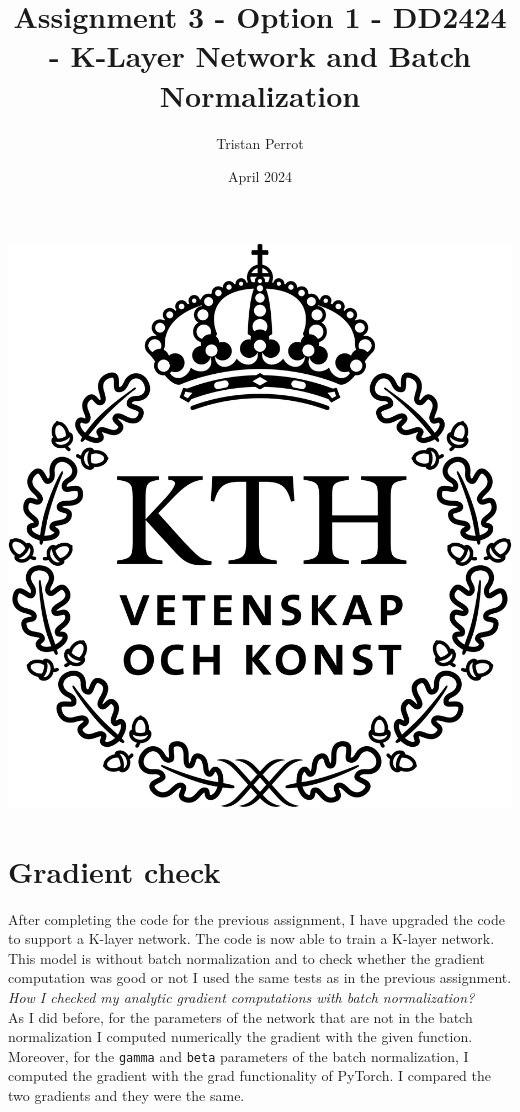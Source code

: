 \documentclass{article}
\title{Assignment 3 - Option 1 - DD2424 - K-Layer Network and Batch Normalization}
\author{Tristan Perrot}
\date{April 2024}
\begin{document}
\maketitle
\begin{center}
    \includegraphics[scale=0.25]{images/KTH_logo_RGB_svart.png}
\end{center}

\section*{Gradient check}

After completing the code for the previous assignment, I have upgraded the code to support a K-layer network. The code is now able to train a K-layer network. This model is without batch normalization and to check whether the gradient computation was good or not I used the same tests as in the previous assignment. \\
\textit{How I checked my analytic gradient computations with batch normalization?} \\
As I did before, for the parameters of the network that are not in the batch normalization I computed numerically the gradient with the given function. Moreover, for the \texttt{gamma} and \texttt{beta} parameters of the batch normalization, I computed the gradient with the grad functionality of PyTorch. I compared the two gradients and they were the same. \\
\end{document}
